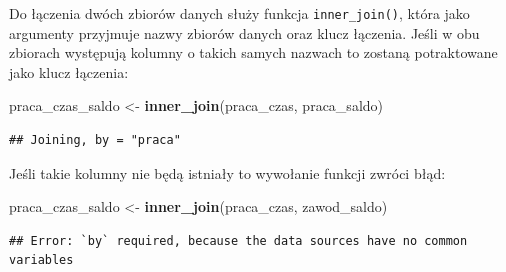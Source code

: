 \documentclass[]{book}
\newenvironment{Shaded}{\begin{snugshade}}{\end{snugshade}}
\newcommand{\KeywordTok}[1]{\textcolor[rgb]{0.13,0.29,0.53}{\textbf{#1}}}
\newcommand{\DataTypeTok}[1]{\textcolor[rgb]{0.13,0.29,0.53}{#1}}
\newcommand{\StringTok}[1]{\textcolor[rgb]{0.31,0.60,0.02}{#1}}
\newcommand{\OperatorTok}[1]{\textcolor[rgb]{0.81,0.36,0.00}{\textbf{#1}}}
\newcommand{\NormalTok}[1]{#1}
\begin{document}
\begin{Shaded}
\end{Shaded}

Do łączenia dwóch zbiorów danych służy funkcja \texttt{inner\_join()},
która jako argumenty przyjmuje nazwy zbiorów danych oraz klucz łączenia.
Jeśli w obu zbiorach występują kolumny o takich samych nazwach to
zostaną potraktowane jako klucz łączenia:

\begin{Shaded}
\begin{Highlighting}[]
\NormalTok{praca_czas_saldo <-}\StringTok{ }\KeywordTok{inner_join}\NormalTok{(praca_czas, praca_saldo)}
\end{Highlighting}
\end{Shaded}

\begin{verbatim}
## Joining, by = "praca"
\end{verbatim}

Jeśli takie kolumny nie będą istniały to wywołanie funkcji zwróci błąd:

\begin{Shaded}
\begin{Highlighting}[]
\NormalTok{praca_czas_saldo <-}\StringTok{ }\KeywordTok{inner_join}\NormalTok{(praca_czas, zawod_saldo)}
\end{Highlighting}
\end{Shaded}

\begin{verbatim}
## Error: `by` required, because the data sources have no common variables
\end{verbatim}
\end{document}
